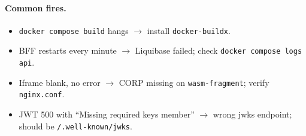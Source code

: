 \documentclass[11pt,a4paper,openany]{book}
\begin{document}
\paragraph{Common fires.}
\begin{itemize}
  \item \texttt{docker compose build} hangs $\rightarrow$ install
        \texttt{docker-buildx}.
  \item BFF restarts every minute $\rightarrow$ Liquibase failed; check
        \texttt{docker compose logs api}.
  \item Iframe blank, no error $\rightarrow$ CORP missing on
        \texttt{wasm-fragment}; verify \texttt{nginx.conf}.
  \item JWT 500 with ``Missing required keys member'' $\rightarrow$
        wrong jwks endpoint; should be \texttt{/.well-known/jwks}.
\end{itemize}
\end{document}
